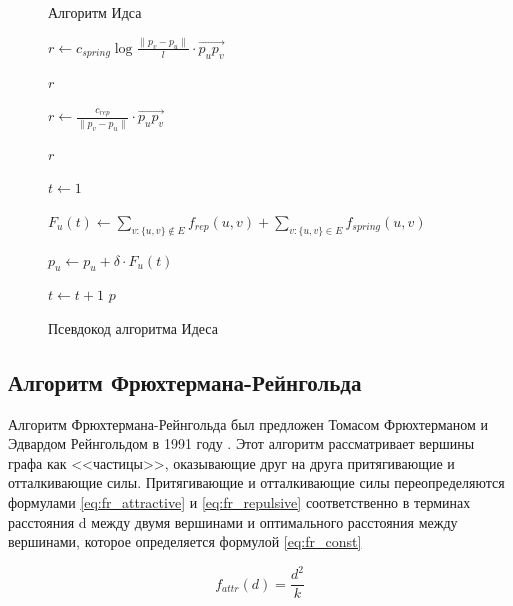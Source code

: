 \documentclass[14pt, russian]{scrartcl}
\begin{document}
\begin{figure}[H]
\centering
  \begin{minipage}[t]{.9\textwidth}
  \centering
 
\begin{algorithm}[H]
\caption{Алгоритм Идса}
\begin{algorithmic}

  \State $r \gets c_{spring}\log{\frac{\|p_v - p_u \|}{l}}  \cdot \overrightarrow{p_u p_v}  $
  
  \Return $r$  
  \EndFunction

 
  \State $r \gets \frac{c_{rep}}{\|p_v - p_u \|} \cdot \overrightarrow{p_u p_v}  $
  
  \Return $r$  
  \EndFunction
 

	\State $t \gets 1$

			\State $F_{u}(t) \gets \sum_{v:\{u,v\} \notin E}{f_{rep}(u, v)} + \sum_{v:\{u,v\} \in E}{f_{spring}(u, v)}$
		

		\EndFor
			\State $p_u \gets p_u + \delta \cdot F_u(t)$
		\EndFor
		
		\State $t \gets t + 1$
	\EndWhile
	\Return $p$
	\EndFunction


\end{algorithmic}
\end{algorithm} 
  \end{minipage}
\caption{Псевдокод алгоритма Идеса}
\label{fig:eades_alg}
\end{figure}


\newpage 

\subsection{Алгоритм Фрюхтермана-Рейнгольда }

Алгоритм Фрюхтермана-Рейнгольда был предложен Томасом Фрюхтерманом и Эдвардом Рейнгольдом в 1991 году \cite{FR}. Этот алгоритм рассматривает вершины графа как <<частицы>>, оказывающие друг на друга притягивающие и  отталкивающие силы. Притягивающие и отталкивающие
силы переопределяются формулами \ref{eq:fr_attractive} и \ref{eq:fr_repulsive} соответственно в терминах расстояния d между двумя вершинами и оптимального расстояния между вершинами, которое определяется формулой \ref{eq:fr_const}


\begin{equation}\label{eq:fr_attractive}
  f_{attr}(d) = \frac{d^2}{k}
\end{equation}
\end{document}
